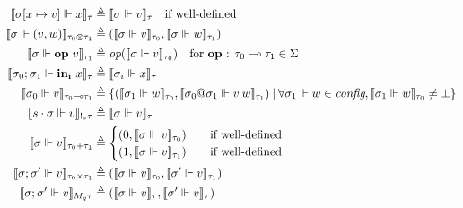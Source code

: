 \begin{definition}
\begin{equation}
\begin{aligned}[c]
  \llbracket \sigma [x \mapsto v] \Vdash x \rrbracket_{\tau} &\triangleq
    \llbracket \sigma \Vdash v \rrbracket_{\tau} \quad \text{if well-defined} \\
  \llbracket \sigma \Vdash (v, w) \rrbracket_{\tau_0 \otimes \tau_1} &\triangleq
    (\llbracket \sigma \Vdash v \rrbracket_{\tau_0}, \llbracket \sigma \Vdash w
    \rrbracket_{\tau_1}) \\
  \llbracket \sigma \Vdash \mathbf{op} \ v \rrbracket_{\tau_1}
    &\triangleq \textit{op} (\llbracket \sigma \Vdash v \rrbracket_{\tau_0})
    \quad \text{for \textbf{op} : $\tau_0 \multimap \tau_1 \in \Sigma$} \\
  \llbracket \sigma_0; \sigma_1 \Vdash \mathbf{in_i} \ x \rrbracket_{\tau}
    &\triangleq \llbracket \sigma_i \Vdash x \rrbracket_{\tau} \\
  \llbracket \sigma_0 \Vdash v \rrbracket_{\tau_0 \multimap \tau_1}
    &\triangleq \{ (\llbracket \sigma_1 \Vdash w \rrbracket_{\tau_0}, \llbracket
    \sigma_0 @ \sigma_1 \Vdash v \> w \rrbracket_{\tau_1}) \> | \>
    \forall \sigma_1 \Vdash w \in \textit{config}, \llbracket \sigma_1 \Vdash w
    \rrbracket_{\tau_0} \not= \bot \} \\
    \llbracket s \cdot \sigma \Vdash v \rrbracket_{!_s \tau} &\triangleq \llbracket
    \sigma \Vdash v \rrbracket_\tau \\
  \llbracket \sigma \Vdash v \rrbracket_{\tau_0 + \tau_1} &\triangleq
    \begin{cases}
      (0, \llbracket \sigma \Vdash v \rrbracket_{\tau_0}) \quad &\text{if well-defined} \\
      (1, \llbracket \sigma \Vdash v \rrbracket_{\tau_1}) \quad &\text{if well-defined}
    \end{cases} \\
  \llbracket \sigma; \sigma' \Vdash v \rrbracket_{\tau_0 \times \tau_1}
    &\triangleq (\llbracket \sigma \Vdash v \rrbracket_{\tau_0}, \llbracket
    \sigma' \Vdash v \rrbracket_{\tau_1}) \\
  \llbracket \sigma; \sigma' \Vdash v \rrbracket_{M_q \tau} &\triangleq
    (\llbracket \sigma \Vdash v \rrbracket_{\tau}, \llbracket \sigma' \Vdash v
    \rrbracket_{\tau}) \\

\end{aligned}
\end{equation}
\end{definition}
